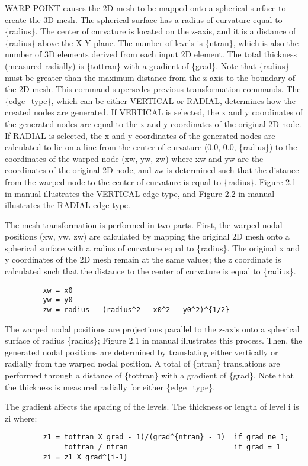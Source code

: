 WARP POINT causes the 2D mesh to be mapped onto a spherical surface to
create the 3D mesh.  The spherical surface has a radius of curvature
equal to \{radius\}.  The center of curvature is located on the z-axis,
and it is a distance of \{radius\} above the X-Y plane.  The number of
levels is \{ntran\}, which is also the number of 3D elements derived from
each input 2D element.  The total thickness (measured radially) is
\{tottran\} with a gradient of \{grad\}.  Note that \{radius\} must be greater
than the maximum distance from the z-axis to the boundary of the 2D
mesh.  This command supersedes previous transformation commands.
The \{edge\_type\}, which can be either VERTICAL or RADIAL, determines how
the created nodes are generated.  If VERTICAL is selected, the x and y
coordinates of the generated nodes are equal to the x and y coordinates
of the original 2D node.  If RADIAL is selected, the x and y coordinates
of the generated nodes are calculated to lie on a line from the center
of curvature (0.0, 0.0, \{radius\}) to the coordinates of the warped node
(xw, yw, zw) where xw and yw are the coordinates of the original 2D
node, and zw is determined such that the distance from the warped node
to the center of curvature is equal to \{radius\}.  Figure 2.1 in manual
illustrates the VERTICAL edge type, and Figure 2.2 in manual illustrates
the RADIAL edge type. 

The mesh transformation is performed in two parts.  First, the warped
nodal positions (xw, yw, zw) are calculated by mapping the original 2D
mesh onto a spherical surface with a radius of curvature equal to
\{radius\}.  The original x and y coordinates of the 2D mesh remain at the
same values; the z coordinate is calculated such that the distance to
the center of curvature is equal to \{radius\}.  
\begin{verbatim}
         xw = x0
         yw = y0
         zw = radius - (radius^2 - x0^2 - y0^2)^{1/2}
\end{verbatim}
The warped nodal positions are projections parallel to the z-axis onto a
spherical surface of radius \{radius\}; Figure 2.1 in manual illustrates
this process. Then, the generated nodal positions are determined by
translating either vertically or radially from the warped nodal
position.  A total of \{ntran\} translations are performed through a
distance of \{tottran\} with a gradient of \{grad\}.  Note that the
thickness is measured radially for either \{edge\_type\}. 

The gradient affects the spacing of the levels.  The thickness or length
of level i is zi where:  
\begin{verbatim}
         z1 = tottran X grad - 1)/(grad^{ntran} - 1)  if grad ne 1;
              tottran / ntran                         if grad = 1
         zi = z1 X grad^{i-1}
\end{verbatim}
